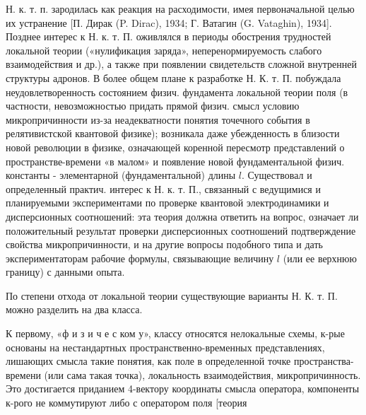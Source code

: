 \documentclass[10pt]{article}
\begin{document}
Н. к. т. п. зародилась как реакция на расходимости, имея первоначальной целью их устранение [П. Дирак (P. Dirac), 1934; Г. Ватагин (G. Vataghin), 1934]. Позднее интерес к Н. к. т. П. оживлялся в периоды обострения трудностей локальной теории («нулификация заряда», неперенормируемость слабого взаимодействия и др.), а также при появлении свидетельств сложной внутренней структуры адронов. В более общем плане к разработке Н. К. т. П. побуждала неудовлетворенность состоянием физич. фундамента локальной теории поля (в частности, невозможностью придать прямой физич. смысл условию микропричинности из-за неадекватности понятия точечного события в релятивистской квантовой физике); возникала даже убежденность в близости новой революции в физике, означающей коренной пересмотр представлений о пространстве-времени «в малом» и появление новой фундаментальной физич. константы - элементарной (фундаментальной) длины $l$. Существовал и определенный практич. интерес к Н. к. т. П., связанный с ведущимися и планируемыми экспериментами по проверке квантовой электродинамики и дисперсионных соотношений: эта теория должна ответить на вопрос, означает ли положительный результат проверки дисперсионных соотношений подтверждение свойства микропричинности, и на другие вопросы подобного типа и дать экспериментаторам рабочие формулы, связывающие величину $l$ (или ее верхнюю границу) с данными опыта.



По степени отхода от локальной теории существующие варианты Н. К. т. П. можно разделить на два класса.



К первому, «ф и з и ч е с ком у», классу относятся нелокальные схемы, к-рые основаны на нестандартных пространственно-временных представлениях, лишающих смысла такие понятия, как поле в определенной точке пространства-времени (или сама такая точка), локальность взаимодействия, микропричинность. Это достигается приданием 4-вектору координаты смысла оператора, компоненты к-рого не коммутируют либо с оператором поля [теория
\end{document}
